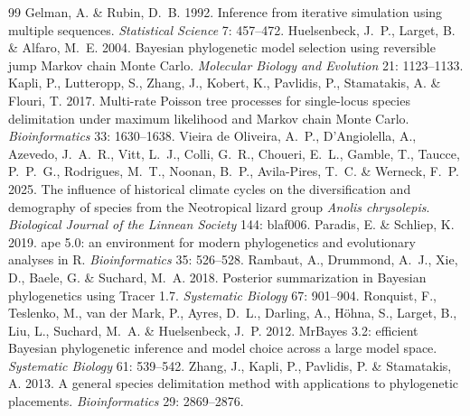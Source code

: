 \documentclass[11pt,a4paper]{article}
\begin{document}
\begin{thebibliography}{99}
 Gelman, A. \& Rubin, D.~B. 1992. Inference from iterative simulation
using multiple sequences. \emph{Statistical Science} 7: 457--472.
 Huelsenbeck, J.~P., Larget, B. \& Alfaro, M.~E. 2004. Bayesian
phylogenetic model selection using reversible jump Markov chain Monte Carlo. \emph{Molecular
Biology and Evolution} 21: 1123--1133.
 Kapli, P., Lutteropp, S., Zhang, J., Kobert, K., Pavlidis, P., Stamatakis, A.
\& Flouri, T. 2017. Multi-rate Poisson tree processes for single-locus species delimitation
under maximum likelihood and Markov chain Monte Carlo. \emph{Bioinformatics} 33: 1630--1638.
 Vieira de Oliveira, A.~P., D'Angiolella, A., Azevedo, J.~A.~R., Vitt,
L.~J., Colli, G.~R., Choueri, E.~L., Gamble, T., Taucce, P.~P.~G., Rodrigues, M.~T., Noonan,
B.~P., Avila-Pires, T.~C. \& Werneck, F.~P. 2025. The influence of historical climate cycles on
the diversification and demography of species from the Neotropical lizard group \emph{Anolis
chrysolepis}. \emph{Biological Journal of the Linnean Society} 144: blaf006.
 Paradis, E. \& Schliep, K. 2019. ape 5.0: an environment for modern
phylogenetics and evolutionary analyses in R. \emph{Bioinformatics} 35: 526--528.
 Rambaut, A., Drummond, A.~J., Xie, D., Baele, G. \& Suchard, M.~A. 2018.
Posterior summarization in Bayesian phylogenetics using Tracer 1.7. \emph{Systematic Biology}
67: 901--904.
 Ronquist, F., Teslenko, M., van der Mark, P., Ayres, D.~L., Darling, A.,
Höhna, S., Larget, B., Liu, L., Suchard, M.~A. \& Huelsenbeck, J.~P. 2012. MrBayes 3.2:
efficient Bayesian phylogenetic inference and model choice across a large model space.
\emph{Systematic Biology} 61: 539--542.
 Zhang, J., Kapli, P., Pavlidis, P. \& Stamatakis, A. 2013. A general
species delimitation method with applications to phylogenetic placements.
\emph{Bioinformatics} 29: 2869--2876.
\end{thebibliography}
\end{document}
